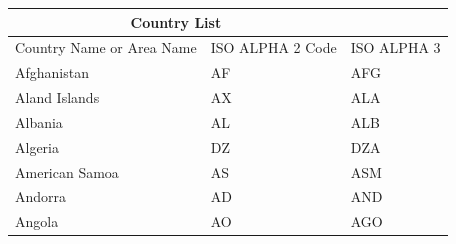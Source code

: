 \documentclass{article}
\begin{document}
\setlength{\arrayrulewidth}{1mm}
\setlength{\tabcolsep}{18pt}
\renewcommand{\arraystretch}{2.5}

{
\begin{tabular}{ |p{3cm}|p{3cm}|p{3cm}|  }
\hline
\multicolumn{2}{|c|}{Country List} & \\
\hline
Country Name     or Area Name& ISO ALPHA 2 Code &ISO ALPHA 3 \\
\hline
Afghanistan & AF &AFG \\
Aland Islands & AX   & ALA \\
Albania &AL & ALB \\
Algeria    &DZ & DZA \\
American Samoa & AS & ASM \\
Andorra & AD & AND   \\
Angola & AO & AGO \\
\hline
\end{tabular}
}
\setlength{\arrayrulewidth}{1mm}
\setlength{\tabcolsep}{18pt}
\renewcommand{\arraystretch}{2.5}
 
 
 
\end{document}
